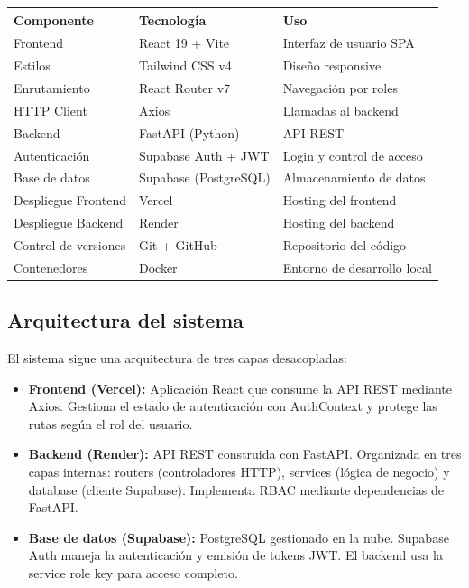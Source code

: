 \documentclass[12pt,a4paper]{article}
\begin{document}
	\begin{longtable}{p{4cm} p{4cm} p{6cm}}
	\toprule
	\textbf{Componente} & \textbf{Tecnología} & \textbf{Uso} \\
	\midrule
	Frontend & React 19 + Vite & Interfaz de usuario SPA \\
	Estilos & Tailwind CSS v4 & Diseño responsive \\
	Enrutamiento & React Router v7 & Navegación por roles \\
	HTTP Client & Axios & Llamadas al backend \\
	Backend & FastAPI (Python) & API REST \\
	Autenticación & Supabase Auth + JWT & Login y control de acceso \\
	Base de datos & Supabase (PostgreSQL) & Almacenamiento de datos \\
	Despliegue Frontend & Vercel & Hosting del frontend \\
	Despliegue Backend & Render & Hosting del backend \\
	Control de versiones & Git + GitHub & Repositorio del código \\
	Contenedores & Docker & Entorno de desarrollo local \\
	\bottomrule
	\end{longtable}

	\subsection{Arquitectura del sistema}

	El sistema sigue una arquitectura de tres capas desacopladas:

	\begin{itemize}
	\setlength{\itemindent}{1cm}
	\item \textbf{Frontend (Vercel):} Aplicación React que consume la API REST mediante Axios. Gestiona el estado de autenticación con AuthContext y protege las rutas según el rol del usuario.
	\item \textbf{Backend (Render):} API REST construida con FastAPI. Organizada en tres capas internas: routers (controladores HTTP), services (lógica de negocio) y database (cliente Supabase). Implementa RBAC mediante dependencias de FastAPI.
	\item \textbf{Base de datos (Supabase):} PostgreSQL gestionado en la nube. Supabase Auth maneja la autenticación y emisión de tokens JWT. El backend usa la service role key para acceso completo.
	\end{itemize}
	
\end{document}
